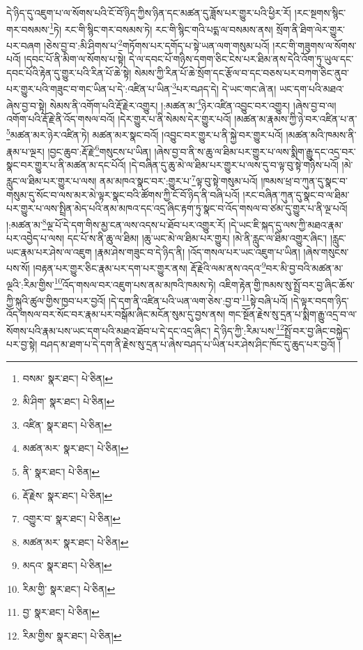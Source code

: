 དེ་ཉིད་དུ་འཇུག་པ་ལ་སོགས་པའི་ངོ་བོ་ཉིད་ཀྱིས་ཉིན་དང་མཚན་དུ་ཟློས་པར་གྱུར་པའི་ཕྱིར་རོ། །རང་སྔགས་སྙིང་གར་བསམས་\footnote{བསམ་  སྣར་ཐང་།  པེ་ཅིན། }ཏེ། རང་གི་སྙིང་གར་བསམས་ཏེ། རང་གི་སྙིང་གའི་པདྨ་ལ་བསམས་ནས། སྲོག་ནི་ཐིག་ལེར་གྱུར་པར་བཞག །ཅེས་བྱ་བ་:མི་ཤིགས་པ་\footnote{མི་ཤིག་  སྣར་ཐང་།  པེ་ཅིན། }གཏོགས་པར་དགོད་པ་སྟེ་ཡན་ལག་གསུམ་པའོ། །རང་གི་གཟུགས་ལ་སོགས་པའོ། །དབང་པོ་ནི་མིག་ལ་སོགས་པ་སྟེ། དེ་ལ་དབང་པོ་གཉིས་དགག་ཅིང་ངེས་པར་ཐིམ་ནས་དེའི་འོག་ཏུ་ཡུལ་དང་དབང་པོའི་རྟེན་དུ་གྱུར་པའི་རིན་པོ་ཆེ་སྟེ། སེམས་ཀྱི་རིན་པོ་ཆེ་སྲོག་དང་རྩོལ་བ་དང་བཅས་པར་བཀག་ཅིང་ནུབ་པར་གྱུར་པའི་གཟུང་བ་གང་ཡིན་པ་དེ་:འཛིན་པ་ཡིན་\footnote{འཛིན་  སྣར་ཐང་།  པེ་ཅིན། }པར་བཤད་དེ། དེ་ཡང་གང་ཞེ་ན། ཡང་དག་པའི་མཐའ་ཞེས་བྱ་བ་སྟེ། སེམས་ནི་འགོག་པའི་རྡོ་རྗེར་འགྱུར། །:མཚན་མ་\footnote{མཚན་མར་  སྣར་ཐང་།  པེ་ཅིན། }ཉེར་འཛིན་འབྱུང་བར་འགྱུར། །ཞེས་བྱ་བ་ལ། འགོག་པའི་རྡོ་རྗེ་ནི་འོད་གསལ་བའོ། །དེར་གྱུར་པ་ནི་སེམས་དེར་གྱུར་པའོ། །མཚན་མ་རྣམས་ཀྱི་ཉེ་བར་འཛིན་པ་ན་\footnote{ནི་  སྣར་ཐང་།  པེ་ཅིན། }མཚན་མར་ཉེར་འཛིན་ཏེ། མཚན་མར་སྣང་བའོ། །འབྱུང་བར་གྱུར་པ་ནི་སྐྱེ་བར་གྱུར་པའོ། །མཚན་མའི་ཁམས་ནི་རྣམ་པ་ལྔར། །བྱང་ཆུབ་:རྡོ་རྗེ་\footnote{རྡོ་རྗེས་  སྣར་ཐང་།  པེ་ཅིན། }གསུངས་པ་ཡིན། །ཞེས་བྱ་བ་ནི་ས་ཆུ་ལ་ཐིམ་པར་གྱུར་པ་ལས་སྨིག་རྒྱུ་དང་འདྲ་བར་སྣང་བར་གྱུར་པ་ནི་མཚན་མ་དང་པོའོ། །དེ་བཞིན་དུ་ཆུ་མེ་ལ་ཐིམ་པར་གྱུར་པ་ལས་དུ་བ་ལྟ་བུ་སྟེ་གཉིས་པའོ། །མེ་རླུང་ལ་ཐིམ་པར་གྱུར་པ་ལས། ནམ་མཁའ་སྣང་བར་:གྱུར་པ་\footnote{འགྱུར་བ་  སྣར་ཐང་།  པེ་ཅིན། }ལྟ་བུ་སྟེ་གསུམ་པའོ། །ཁམས་ཕྲ་བ་ཀུན་དུ་སྣང་བ་གསུམ་དུ་སོང་བ་ལས་མར་མེ་ལྟར་སྣང་བའི་ཚོགས་ཀྱི་ངོ་བོ་ཉིད་ནི་བཞི་པའོ། །རང་བཞིན་ཀུན་དུ་སྣང་བ་ལ་ཐིམ་པར་གྱུར་པ་ལས་སྤྲིན་མེད་པའི་ནམ་མཁའ་དང་འདྲ་ཞིང་རྟག་ཏུ་སྣང་བ་འོད་གསལ་བ་ཙམ་དུ་གྱུར་པ་ནི་ལྔ་པའོ། །:མཚན་མ་\footnote{མཚན་མར་  སྣར་ཐང་།  པེ་ཅིན། }ལྔ་པོ་དེ་དག་གིས་མྱ་ངན་ལས་འདས་པ་ཐོབ་པར་འགྱུར་རོ། །དེ་ཡང་ཇི་སྐད་དུ་ལས་ཀྱི་མཐའ་རྣམ་པར་འབྱེད་པ་ལས། དང་པོ་ས་ནི་ཆུ་ལ་ཐིམ། །ཆུ་ཡང་མེ་ལ་ཐིམ་པར་གྱུར། །མེ་ནི་རླུང་ལ་ཐིམ་འགྱུར་ཞིང་། །རླུང་ཡང་རྣམ་པར་ཤེས་ལ་འཇུག །རྣམ་ཤེས་གཟུང་བ་དེ་ཉིད་ནི། །འོད་གསལ་པར་ཡང་འཇུག་པ་ཡིན། །ཞེས་གསུངས་པས་སོ། །བརྟན་པར་གྱུར་ཅིང་རྣམ་པར་དག་པར་གྱུར་ནས། རྡོ་རྗེའི་ལམ་ནས་འདའ་\footnote{མདའ་  སྣར་ཐང་།  པེ་ཅིན། }བར་མི་བྱ་བའི་མཚན་མ་ལྔའི་:རིམ་གྱིས་\footnote{རིམ་གྱི་  སྣར་ཐང་།  པེ་ཅིན། }འོད་གསལ་བར་འཇུག་པས་ནམ་མཁའི་ཁམས་ཏེ། འཇིག་རྟེན་གྱི་ཁམས་སུ་སྤྲོ་བར་བྱ་ཞིང་ཆོས་ཀྱི་སྐུའི་ཚུལ་གྱིས་ཁྱབ་པར་བྱའོ། །དེ་དག་ནི་འཛིན་པའི་ཡན་ལག་ཅེས་:བྱ་བ་\footnote{བྱ་  སྣར་ཐང་།  པེ་ཅིན། }སྟེ་བཞི་པའོ། །དེ་ལྟར་བདག་ཉིད་འོད་གསལ་བར་སོང་བར་རྣམ་པར་བསྒོམ་ཞིང་མངོན་སུམ་དུ་བྱས་ནས། གང་སྔོན་རྗེས་སུ་དྲན་པ་སྨིག་རྒྱུ་འདྲ་བ་ལ་སོགས་པའི་རྣམ་པས་ཡང་དག་པའི་མཐའ་ཐོབ་པ་དེ་དང་འདྲ་ཞིང་། དེ་ཉིད་ཀྱི་:རིམ་པས་\footnote{རིམ་གྱིས་  སྣར་ཐང་།  པེ་ཅིན། }སྤྲོ་བར་བྱ་ཞིང་བསྐྱེད་པར་བྱ་སྟེ། བཤད་མ་ཐག་པ་དེ་དག་ནི་རྗེས་སུ་དྲན་པ་ཞེས་བཤད་པ་ཡིན་པར་ཤེས་ཤིང་ཁོང་དུ་ཆུད་པར་བྱའོ། །
